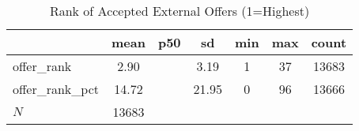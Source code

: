 \begin{table}[htbp]\centering
\def\sym#1{\ifmmode^{#1}\else\(^{#1}\)\fi}
\caption{Rank of Accepted External Offers (1=Highest)}
\begin{tabular}{l*{1}{cccccc}}
\hline\hline
            &        mean&         p50&          sd&         min&         max&       count\\
\hline
offer\_rank  &        2.90&            &        3.19&           1&          37&       13683\\
offer\_rank\_pct&       14.72&            &       21.95&           0&          96&       13666\\
\hline
\(N\)       &       13683&            &            &            &            &            \\
\hline\hline
\end{tabular}
\end{table}
